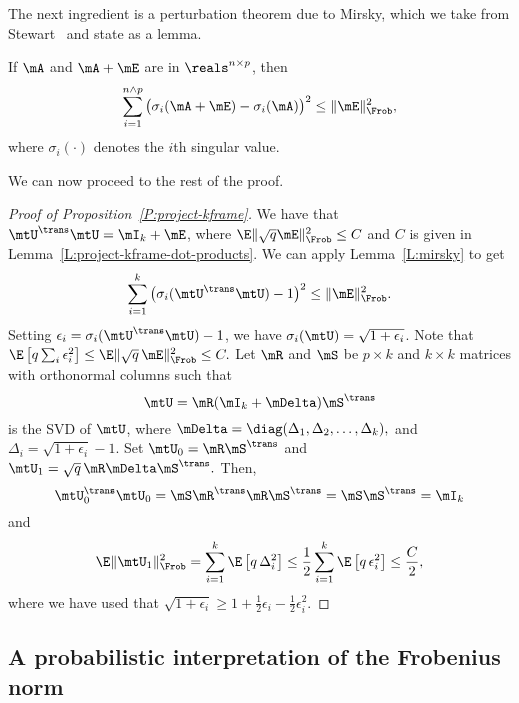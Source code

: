 The next ingredient is a perturbation theorem due to Mirsky, which we take 
from Stewart~\cite{stewart1990pts} and state as a lemma.

\begin{lemma}[Mirsky]\label{L:mirsky}
    If $\mA$ and $\mA + \mE$ are in $\reals^{n \times p}$, then
    \[
        \sum_{i=1}^{n \wedge p} 
            \big(
                \sigma_i(\mA + \mE) - \sigma_i( \mA ) 
            \big)^2 
        \leq \| \mE \|_\Frob^2,
    \]
    where $\sigma_i(\cdot)$ denotes the $i$th singular value.
\end{lemma}

We can now proceed to the rest of the proof.
\begin{proof}[Proof of Proposition~\ref{P:project-kframe}]
    We have that $\mtU^\trans \mtU = \mI_k + \mE$, 
    where $\E \| \sqrt{q} \mE \|_\Frob^2 \leq C$ and $C$ is
    given in Lemma~\ref{L:project-kframe-dot-products}.
    We can apply Lemma~\ref{L:mirsky} to get
    \[
        \sum_{i=1}^k 
            \big(
                \sigma_i(\mtU^\trans \mtU) - 1
            \big)^2 
        \leq \| \mE \|_\Frob^2.
    \]
    Setting $\epsilon_i = \sigma_i(\mtU^\trans \mtU) - 1$, we have 
    $\sigma_i( \mtU ) = \sqrt{1 + \epsilon_i}$.  Note that 
    \(
        \E \left[ q \sum_i \epsilon_i^2 \right]
        \leq \E \| \sqrt{q} \, \mE \|_\Frob^2
        \leq C.
    \)
    Let $\mR$ and $\mS$ be $p \times k$ and $k \times k$ matrices
    with orthonormal columns such that
    \[
        \mtU = \mR (\mI_k + \mDelta) \mS^\trans
    \]
    is the SVD of $\mtU$, where 
    \(
        \mDelta
            = 
                \diag( 
                    \Delta_1, \Delta_2, \ldots, \Delta_k
                ),
    \)
    and $\Delta_i = \sqrt{ 1 + \epsilon_i } - 1.$  Set
    \(
        \mtU_0 = \mR \mS^\trans
    \)
    and
    \(
        \mtU_1 = \sqrt{q} \, \mR \mDelta \mS^\trans.
    \)
    Then,
    \[
        \mtU_0^\trans \mtU_0 
                = \mS \mR^\trans \mR \mS^\trans
                = \mS \mS^\trans
                = \mI_k
    \]
    and 
    \[
        \E \| \mtU_1 \|_\Frob^2 
            = \sum_{i=1}^k \E \left[ q \, \Delta_i^2 \right]
            \leq \frac{1}{2} \sum_{i=1}^k \E \left[ q \, \epsilon_i^2 \right]
            \leq \frac{C}{2},
    \]
    where we have used that
    \(
        \sqrt{1 + \epsilon_i} 
            \geq 
                1 + \frac{1}{2} \epsilon_i - \frac{1}{2} \epsilon_i^2.
    \)
\end{proof}


\subsection{A probabilistic interpretation of the Frobenius norm}
\label{S:probabilistic-frob}

